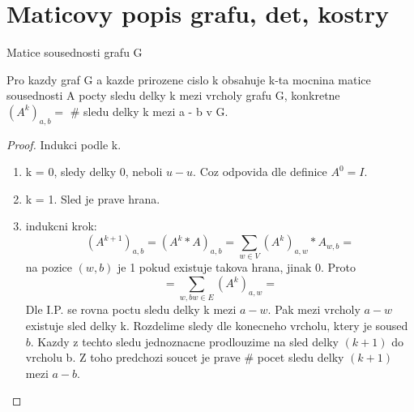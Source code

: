\section{\texorpdfstring{Maticovy popis grafu, det, kostry}{Maticovy popis grafu, det, kostry}}
\vspace{5mm}
\large

\begin{definition}
Matice sousednosti grafu G
\end{definition}

\begin{theorem}
Pro kazdy graf G a kazde prirozene cislo k obsahuje k-ta mocnina matice sousednosti A pocty sledu delky k mezi vrcholy grafu G, konkretne\\
$(A^k)_{a,b} = $ \# sledu delky k mezi a - b v G.
\end{theorem}
\begin{proof}
Indukci podle k.
\begin{enumerate}
	\item k = 0, sledy delky 0, neboli $ u - u $. Coz odpovida dle definice $ A^0 = I $.
	\item k = 1. Sled je prave hrana.
	\item indukcni krok:
	\[(A^{k+1})_{a,b} = (A^k * A)_{a,b} = \sum_{w \in V} (A^k)_{a,w} * A_{w,b} = \]
	na pozice $ (w,b) $ je 1 pokud existuje takova hrana, jinak 0. Proto
	\[ = \sum_{w, bw \in E} (A^k)_{a,w} = \]
	Dle I.P. se rovna poctu sledu delky k mezi $a - w$.
	Pak mezi vrcholy $ a - w $ existuje sled delky k. Rozdelime sledy dle konecneho vrcholu, ktery je soused $b$. Kazdy z techto sledu jednoznacne prodlouzime na sled delky $(k+1)$ do vrcholu b. Z toho predchozi soucet je prave \# pocet sledu delky $(k+1)$ mezi $ a - b $.
\end{enumerate}
\end{proof}

